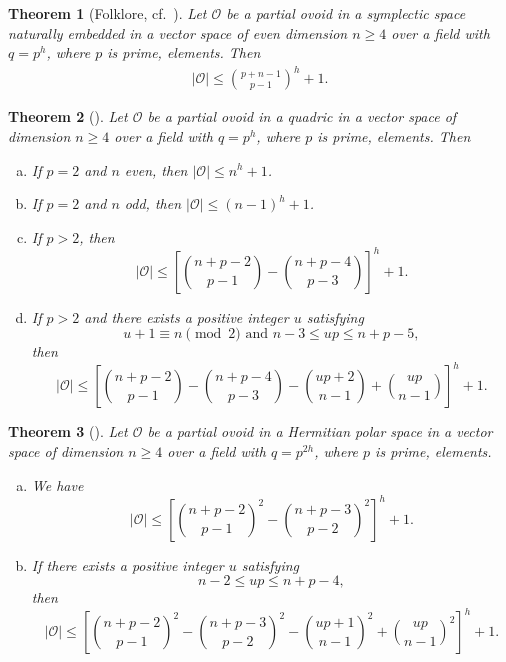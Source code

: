 \documentclass[a4paper,11pt]{amsproc}
\theoremstyle{plain}
\newtheorem{Theorem} {Theorem} [section]
\theoremstyle{definition}
\newcommand{\<}{\langle}
\renewcommand{\>}{\rangle} %
\begin{document}
\begin{Theorem}[Folklore, cf.~\cite{AS2011,BM1995}] \label{thm:symp_bnd}
  Let $\mathcal{O}$ be a partial ovoid in a symplectic space naturally embedded
  in a vector space of even
  dimension $n \geq 4$ over a field with $q = p^h$, where $p$ is prime, elements.
  Then 
  \begin{align*}
    |\mathcal{O}| \leq \binom{p+n-1}{p-1}^h +1.
  \end{align*}
\end{Theorem}


\begin{Theorem}[{\cite[Theorem 1.6]{AS2011}}]\label{thm:quadric_bnd}
  Let $\mathcal{O}$ be a partial ovoid in a quadric in a vector space of 
  dimension $n \geq 4$ over a field with $q = p^h$, where $p$ is prime, elements.
  Then 
  \begin{enumerate}[(a)]
   \item If $p=2$ and $n$ even, then $|\mathcal{O}| \leq n^h+1$.
   \item If $p=2$ and $n$ odd, then $|\mathcal{O}| \leq (n-1)^h+1$.
   \item If $p>2$, then 
   \[
      |\mathcal{O}| \leq \left[ \binom{n+p-2}{p-1} - \binom{n+p-4}{p-3} \right]^h + 1.
   \]
   \item If $p>2$ and there exists a positive integer $u$ satisfying
   \[
     u+1 \equiv n \pmod{2} \text{ and } n-3 \leq up \leq n+p-5,
   \]
   then 
   \[
    |\mathcal{O}| \leq \left[ \binom{n+p-2}{p-1} - \binom{n+p-4}{p-3} - \binom{up+2}{n-1} + \binom{up}{n-1} \right]^h + 1.
   \]
  \end{enumerate}
\end{Theorem}

\begin{Theorem}[{\cite[Theorem 1.8]{AS2011}}]\label{thm:herm_bnd}
  Let $\mathcal{O}$ be a partial ovoid in a Hermitian polar space in a vector space of 
  dimension $n \geq 4$ over a field with $q = p^{2h}$, where $p$ is prime, elements.
  \begin{enumerate}[(a)]
   \item  We have 
   \[
      |\mathcal{O}| \leq \left[ \binom{n+p-2}{p-1}^2 - \binom{n+p-3}{p-2}^2 \right]^h + 1.
   \]
   \item If there exists a positive integer $u$ satisfying 
   \[
     n-2 \leq up \leq n+p-4,
   \]
   then 
   \[
    |\mathcal{O}| \leq \left[ \binom{n+p-2}{p-1}^2 - \binom{n+p-3}{p-2}^2 - \binom{up+1}{n-1}^2 + \binom{up}{n-1}^2 \right]^h + 1.
   \]
  \end{enumerate}
\end{Theorem}
\end{document}
